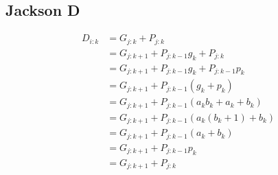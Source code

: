 \subsection{Jackson D}
\begin{equation}
\begin{split}
    D_{i:k} &= G_{j:k} + P_{j:k}\\
            &= G_{j:k+1} + P_{j:k-1}g_k  + P_{j:k}\\
            &= G_{j:k+1} + P_{j:k-1}g_k  + P_{j:k-1}p_k\\
            &= G_{j:k+1} + P_{j:k-1}(g_k + p_k)\\
            &= G_{j:k+1} + P_{j:k-1}( a_kb_k + a_k + b_k )\\
            &= G_{j:k+1} + P_{j:k-1}( a_k(b_k + 1) + b_k )\\
            &= G_{j:k+1} + P_{j:k-1}( a_k + b_k )\\
            &= G_{j:k+1} + P_{j:k-1}p_k \\
            &= G_{j:k+1} + P_{j:k}
\end{split}
\end{equation}

